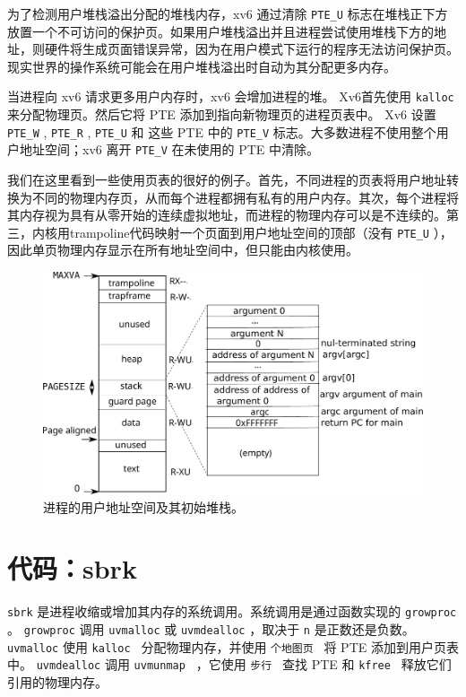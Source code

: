 \documentclass[UTF8]{article}
\begin{document}
为了检测用户堆栈溢出分配的堆栈内存，xv6 通过清除    \lstinline{PTE_U}    标志在堆栈正下方放置一个不可访问的保护页。如果用户堆栈溢出并且进程尝试使用堆栈下方的地址，则硬件将生成页面错误异常，因为在用户模式下运行的程序无法访问保护页。现实世界的操作系统可能会在用户堆栈溢出时自动为其分配更多内存。  

当进程向 xv6 请求更多用户内存时，xv6 会增加进程的堆。 Xv6首先使用 {    \tt    kalloc   } 来分配物理页。然后它将 PTE 添加到指向新物理页的进程页表中。 Xv6 设置
    \lstinline{PTE_W}    ,
    \lstinline{PTE_R}    ,
    \lstinline{PTE_U}    和
 这些 PTE 中的    \lstinline{PTE_V}    标志。大多数进程不使用整个用户地址空间；xv6 离开
    \lstinline{PTE_V}    在未使用的 PTE 中清除。  

我们在这里看到一些使用页表的很好的例子。首先，不同进程的页表将用户地址转换为不同的物理内存页，从而每个进程都拥有私有的用户内存。其次，每个进程将其内存视为具有从零开始的连续虚拟地址，而进程的物理内存可以是不连续的。第三，内核用trampoline代码映射一个页面到用户地址空间的顶部（没有
    \lstinline{PTE_U}    ），因此单页物理内存显示在所有地址空间中，但只能由内核使用。  

   \begin{figure}[t]
\center
\includegraphics[scale=0.5]{fig/processlayout.pdf}
\caption{进程的用户地址空间及其初始堆栈。  }
\label{fig:processlayout}
\end{figure}     

   \section{代码：sbrk  }     

   \lstinline{sbrk}    是进程收缩或增加其内存的系统调用。系统调用是通过函数实现的
    \lstinline{growproc}   
        。
    \lstinline{growproc}    调用    \lstinline{uvmalloc}    或
    \lstinline{uvmdealloc}    ，取决于    \lstinline{n}    是正数还是负数。
    \lstinline{uvmalloc}   
        使用  {    \tt    kalloc   }  分配物理内存，并使用  {    \tt    个地图页   }  将 PTE 添加到用户页表中。
    \lstinline{uvmdealloc}    调用
  {    \tt    uvmunmap   } 
        ，它使用  {    \tt    步行   }  查找 PTE 和
  {    \tt    kfree   }  释放它们引用的物理内存。  
\end{document}
